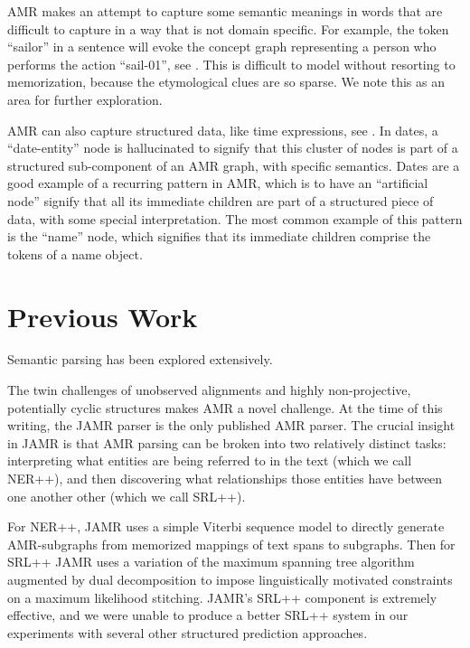 \documentclass[11pt]{article}
\begin{document}


AMR makes an attempt to capture some semantic meanings in words that are difficult to capture in a way that is not domain specific. For example, the token ``sailor'' in a sentence will evoke the concept graph representing a person who performs the action ``sail-01'', see . This is difficult to model without resorting to memorization, because the etymological clues are so sparse. We note this as an area for further exploration.

AMR can also capture structured data, like time expressions, see . In dates, a ``date-entity'' node is hallucinated to signify that this cluster of nodes is part of a structured sub-component of an AMR graph, with specific semantics. Dates are a good example of a recurring pattern in AMR, which is to have an ``artificial node'' signify that all its immediate children are part of a structured piece of data, with some special interpretation. The most common example of this pattern is the ``name'' node, which signifies that its immediate children comprise the tokens of a name object.

\section{Previous Work}

Semantic parsing has been explored extensively. 

The twin challenges of unobserved alignments and highly non-projective, potentially cyclic structures makes AMR a novel challenge.
At the time of this writing, the JAMR parser \cite{Flanigan:14} is the only published AMR parser.
The crucial insight in JAMR is that AMR parsing can be broken into two relatively distinct tasks: interpreting what entities are being referred to in the text (which we call NER++), and then discovering what relationships those entities have between one another other (which we call SRL++).

For NER++, JAMR uses a simple Viterbi sequence model to directly generate AMR-subgraphs from memorized mappings of text spans to subgraphs. Then for SRL++ JAMR uses a variation of the maximum spanning tree algorithm augmented by dual decomposition to impose linguistically motivated constraints on a maximum likelihood stitching. JAMR's SRL++ component is extremely effective, and we were unable to produce a better SRL++ system in our experiments with several other structured prediction approaches.
\end{document}
